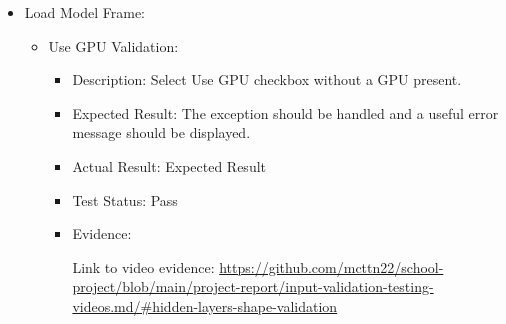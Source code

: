 \documentclass[./project-report/src/latex/project-report.tex]{subfiles}
\begin{document}
\begin{itemize}
    \item Load Model Frame:
    \label{sec:load-model-frame-input-validation}
    \begin{itemize}
        \item Use GPU Validation:
            \begin{itemize}
            \item Description: Select Use GPU checkbox without a GPU present.
            \item Expected Result: The exception should be handled and a useful error message should be displayed.
            \item Actual Result: Expected Result
            \item Test Status: Pass
            \item Evidence:
                \begin{figure}[h!]
                \centering
                \end{figure}

                Link to video evidence: \url{https://github.com/mcttn22/school-project/blob/main/project-report/input-validation-testing-videos.md/#hidden-layers-shape-validation}
            \end{itemize}
    \end{itemize}

    \pagebreak


\end{itemize}
\end{document}
